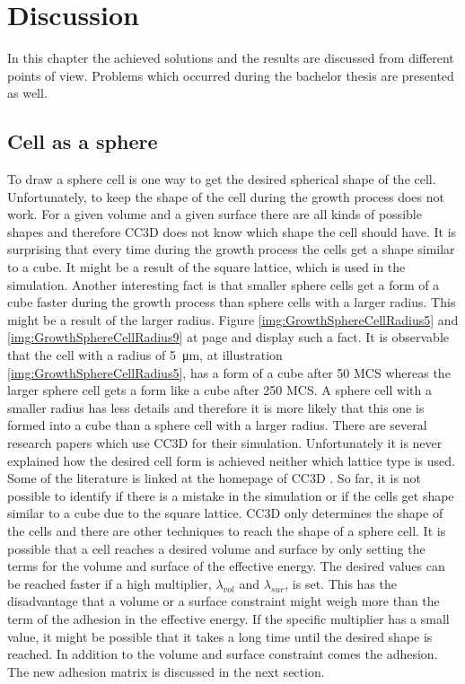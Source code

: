 \chapter{Discussion}
In this chapter the achieved solutions and the results are discussed from different points of view. Problems which occurred during the bachelor thesis are presented as well.

\section{Cell as a sphere}
To draw a sphere cell is one way to get the desired spherical shape of the cell. Unfortunately, to keep the shape of the cell during the growth process does not work. For a given volume and a given surface there are all kinds of possible shapes and therefore \ac{CC3D} does not know which shape the cell should have. It is surprising that every time during the growth process the cells get a shape similar to a cube. It might be a result of the square lattice, which is used in the simulation. Another interesting fact is that smaller sphere cells get a form of a cube faster during the growth process than sphere cells with a larger radius. This might be a result of the larger radius. Figure \ref{img:GrowthSphereCellRadius5} and \ref{img:GrowthSphereCellRadius9} at page \pageref{img:GrowthSphereCellRadius5} and \pageref{img:GrowthSphereCellRadius9} display such a fact. It is observable that the cell with a radius of \SI{5}{\micro\metre}, at illustration \ref{img:GrowthSphereCellRadius5}, has a form of a cube after 50 \ac{MCS} whereas the larger sphere cell gets a form like a cube after 250 \ac{MCS}. A sphere cell with a smaller radius has less details and therefore it is more likely that this one is formed into a cube than a sphere cell with a larger radius. \newline
There are several research papers which use \ac{CC3D} for their simulation. Unfortunately it is never explained how the desired cell form is achieved neither which lattice type is used. Some of the literature is linked at the homepage of \ac{CC3D} \cite{CC3D.org}. So far, it is not possible to identify if there is a mistake in the simulation or if the cells get shape similar to a cube due to the square lattice. \newline
\ac{CC3D} only determines the shape of the cells and there are other techniques to reach the shape of a sphere cell. It is possible that a cell reaches a desired volume and surface by only setting the terms for the volume and surface of the effective energy. The desired values can be reached faster if a high multiplier, $\lambda_{vol}$ and $\lambda_{sur}$, is set. This has the disadvantage that a volume or a surface constraint might weigh more than the term of the adhesion in the effective energy. If the specific multiplier has a small value, it might be possible that it takes a long time until the desired shape is reached. In addition to the volume and surface constraint comes the adhesion. The new adhesion matrix is discussed in the next section.


